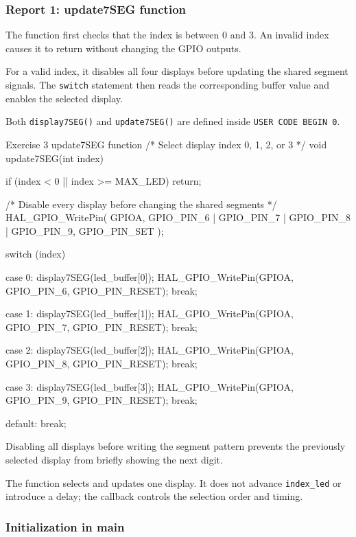 \documentclass[a4paper]{article}
\begin{document}
\subsubsection{Report 1: update7SEG function}

The function first checks that the index is between
0 and 3. An invalid index causes it to return
without changing the GPIO outputs.

For a valid index, it disables all four displays
before updating the shared segment signals.
The \texttt{switch} statement then reads the
corresponding buffer value and enables the
selected display.

Both \texttt{display7SEG()} and
\texttt{update7SEG()} are defined inside
\texttt{USER CODE BEGIN 0}.

\begin{stmcode}{Exercise 3 update7SEG function}
/* Select display index 0, 1, 2, or 3 */
void update7SEG(int index){
    if (index < 0 || index >= MAX_LED)
    {
        return;
    }

    /* Disable every display before changing the shared segments */
    HAL_GPIO_WritePin(
        GPIOA,
        GPIO_PIN_6 | GPIO_PIN_7 | GPIO_PIN_8 | GPIO_PIN_9,
        GPIO_PIN_SET
    );

    switch (index)
    {
        case 0:
            display7SEG(led_buffer[0]);
            HAL_GPIO_WritePin(GPIOA, GPIO_PIN_6, GPIO_PIN_RESET);
            break;

        case 1:
            display7SEG(led_buffer[1]);
            HAL_GPIO_WritePin(GPIOA, GPIO_PIN_7, GPIO_PIN_RESET);
            break;

        case 2:
            display7SEG(led_buffer[2]);
            HAL_GPIO_WritePin(GPIOA, GPIO_PIN_8, GPIO_PIN_RESET);
            break;

        case 3:
            display7SEG(led_buffer[3]);
            HAL_GPIO_WritePin(GPIOA, GPIO_PIN_9, GPIO_PIN_RESET);
            break;

        default:
            break;
    }
  }
\end{stmcode}

Disabling all displays before writing the segment
pattern prevents the previously selected display
from briefly showing the next digit.

The function selects and updates one display.
It does not advance \texttt{index\_led} or introduce
a delay; the callback controls the selection order
and timing.

\subsubsection{Initialization in main}
\end{document}
